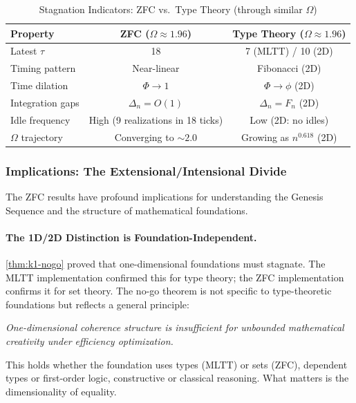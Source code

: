 \documentclass[11pt]{article}
\theoremstyle{definition}
\theoremstyle{remark}
\begin{document}
\begin{table}[htbp]
\centering
\caption{Stagnation Indicators: ZFC vs.\ Type Theory (through similar $\Omega$)}
\label{tab:stagnation-comparison}
\begin{tabular}{@{}lcc@{}}
\hline
\textbf{Property} & \textbf{ZFC ($\Omega \approx 1.96$)} & \textbf{Type Theory ($\Omega \approx 1.96$)} \\
\hline
Latest $\tau$ & 18 & 7 (MLTT) / 10 (2D) \\
Timing pattern & Near-linear & Fibonacci (2D) \\
Time dilation & $\Phi \to 1$ & $\Phi \to \phi$ (2D) \\
Integration gaps & $\Delta_n = O(1)$ & $\Delta_n = F_n$ (2D) \\
Idle frequency & High (9 realizations in 18 ticks) & Low (2D: no idles) \\
$\Omega$ trajectory & Converging to $\sim 2.0$ & Growing as $n^{0.618}$ (2D) \\
\hline
\end{tabular}
\end{table}

\subsubsection{Implications: The Extensional/Intensional Divide}

The ZFC results have profound implications for understanding the Genesis Sequence and the structure of mathematical foundations.

\paragraph{The 1D/2D Distinction is Foundation-Independent.}

\cref{thm:k1-nogo} proved that one-dimensional foundations must stagnate. The MLTT implementation confirmed this for type theory; the ZFC implementation confirms it for set theory. The no-go theorem is not specific to type-theoretic foundations but reflects a general principle:
\begin{center}
\textit{One-dimensional coherence structure is insufficient for unbounded mathematical creativity under efficiency optimization.}
\end{center}

This holds whether the foundation uses types (MLTT) or sets (ZFC), dependent types or first-order logic, constructive or classical reasoning. What matters is the dimensionality of equality.
\end{document}
